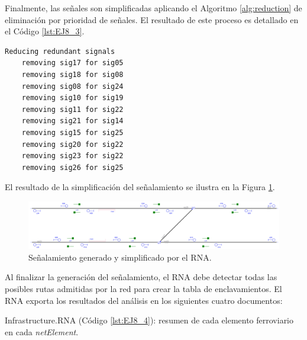 	Finalmente, las señales son simplificadas aplicando el Algoritmo \ref{alg:reduction} de eliminación por prioridad de señales. El resultado de este proceso es detallado en el Código \ref{lst:EJ8_3}.
	
	\begin{lstlisting}[language = {}, caption = Reducción de señalamiento por prioridad de señales, label = {lst:EJ8_3}]
	Reducing redundant signals
	removing sig17 for sig05
	removing sig18 for sig08
	removing sig08 for sig24
	removing sig10 for sig19
	removing sig11 for sig22
	removing sig21 for sig14
	removing sig15 for sig25
	removing sig20 for sig22
	removing sig23 for sig22
	removing sig26 for sig25
	\end{lstlisting}
	
	El resultado de la simplificación del señalamiento se ilustra en la Figura \ref{fig:EJ8_7}.
	
	\begin{figure}[H]
		\centering
		\includegraphics[width=1\textwidth]{resultados-obtenidos/ejemplo8/images/8_RNA.png}
		\centering\caption{Señalamiento generado y simplificado por el RNA.}
		\label{fig:EJ8_7}
	\end{figure}
	
	Al finalizar la generación del señalamiento, el RNA debe detectar todas las posibles rutas admitidas por la red para crear la tabla de enclavamientos. El RNA exporta los resultados del análisis en los siguientes cuatro documentos:
	
	Infrastructure.RNA (Código \ref{lst:EJ8_4}): resumen de cada elemento ferroviario en cada \textit{netElement}.
	
